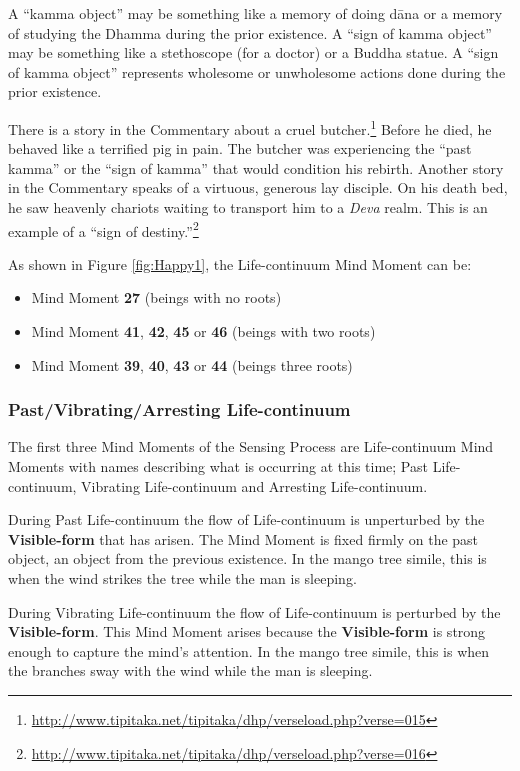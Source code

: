 A “kamma object” may be something like a memory of doing dāna or a memory of studying the Dhamma during the prior existence. A “sign of kamma object” may be something like a stethoscope (for a doctor) or a Buddha statue. A “sign of kamma object” represents wholesome or unwholesome actions done during the prior existence. 

There is a story in the Commentary about a cruel butcher.\footnote{\url{http://www.tipitaka.net/tipitaka/dhp/verseload.php?verse=015}} Before he died, he behaved like a terrified pig in pain. The butcher was experiencing the “past kamma” or the “sign of kamma” that would condition his rebirth. Another story in the Commentary speaks of a virtuous, generous lay disciple. On his death bed, he saw heavenly chariots waiting to transport him to a \textit{Deva} realm. This is an example of a “sign of destiny.”\footnote{\url{http://www.tipitaka.net/tipitaka/dhp/verseload.php?verse=016}}

As shown in Figure \ref{fig:Happy1}, the Life-continuum Mind Moment can be:
\begin{itemize}[nosep]
\item Mind Moment \textbf{27} (beings with no roots)
\item Mind Moment \textbf{41}, \textbf{42}, \textbf{45} or \textbf{46} (beings with two roots)
\item Mind Moment \textbf{39}, \textbf{40}, \textbf{43} or \textbf{44} (beings three roots)
\end{itemize}

\subsubsection*{Past/Vibrating/Arresting Life-continuum}

The first three Mind Moments of the Sensing Process are Life-continuum Mind Moments with names describing what is occurring at this time; Past Life-continuum, Vibrating Life-continuum and Arresting Life-continuum.

\pagebreak

During Past Life-continuum the flow of Life-continuum is unperturbed by the \textbf{Visible-form} that has arisen. The Mind Moment is fixed firmly on the past object, an object from the previous existence. In the mango tree simile, this is when the wind strikes the tree while the man is sleeping.

During Vibrating Life-continuum the flow of Life-continuum is perturbed by the \textbf{Visible-form}. This Mind Moment arises because the \textbf{Visible-form} is strong enough to capture the mind’s attention. In the mango tree simile, this is when the branches sway with the wind while the man is sleeping.

